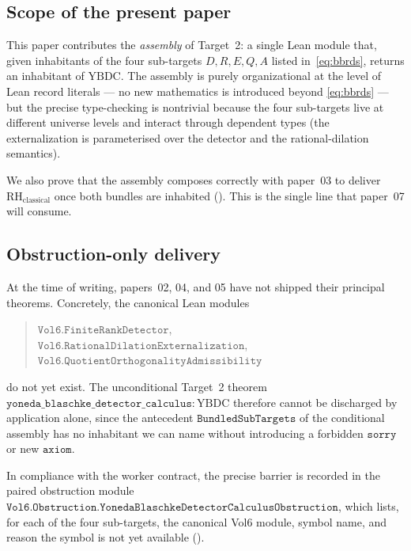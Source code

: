 \documentclass[12pt]{article}
\theoremstyle{plain}
\theoremstyle{definition}
\theoremstyle{remark}
\newcommand{\YBDC}{\mathrm{YBDC}}
\begin{document}
\subsection{Scope of the present paper}

This paper contributes the \emph{assembly} of Target~2: a single Lean
module that, given inhabitants of the four sub-targets
\(D, R, E, Q, A\) listed in~\eqref{eq:bbrds}, returns an inhabitant of
\(\YBDC\). The assembly is purely organizational at the level of Lean
record literals — no new mathematics is introduced beyond
\eqref{eq:bbrds} — but the precise type-checking is nontrivial because
the four sub-targets live at different universe levels and interact
through dependent types (the externalization is parameterised over the
detector and the rational-dilation semantics).

We also prove that the assembly composes correctly with paper~03 to
deliver \(\mathrm{RH}_{\mathrm{classical}}\) once both bundles are
inhabited (). This is the
single line that paper~07 will consume.

\subsection{Obstruction-only delivery}

At the time of writing, papers~02, 04, and 05 have not shipped their
principal theorems. Concretely, the canonical Lean modules
\begin{quote}
  \(\mathtt{Vol6.FiniteRankDetector}\),\\
  \(\mathtt{Vol6.RationalDilationExternalization}\),\\
  \(\mathtt{Vol6.QuotientOrthogonalityAdmissibility}\)
\end{quote}
do not yet exist. The unconditional Target~2 theorem
\(\mathtt{yoneda\_blaschke\_detector\_calculus} : \YBDC\) therefore cannot
be discharged by application alone, since the antecedent
\(\mathtt{BundledSubTargets}\) of the conditional assembly has no
inhabitant we can name without introducing a forbidden \(\mathtt{sorry}\)
or new \(\mathtt{axiom}\).

In compliance with the worker contract, the precise barrier is recorded
in the paired obstruction module
\(\mathtt{Vol6.Obstruction.YonedaBlaschkeDetectorCalculusObstruction}\),
which lists, for each of the four sub-targets, the canonical Vol6
module, symbol name, and reason the symbol is not yet available
().
\end{document}
